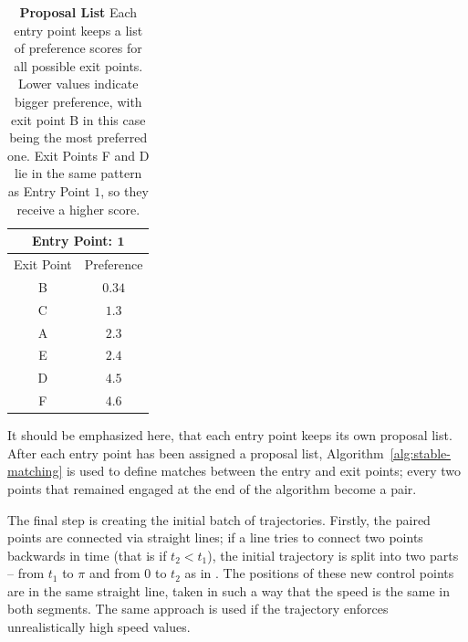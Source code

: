 \begin{table}[b]
	\centering
	\caption{
	\textbf{Proposal List} Each entry point keeps a list of preference scores for all possible exit points.
	Lower values indicate bigger preference, with exit point B in this case being the most preferred one.
	Exit Points F and D lie in the same pattern as Entry Point $1$, so they receive a higher score.
	}
	\begin{tabular}{|c|c|}
		\hline
		\multicolumn{2}{|c|}{\textbf{Entry Point: } $\mathbf{1}$}	\\
 		\hline
 		\hline
		Exit Point	&	Preference\\
		\hline
		\rowcolor[gray]{0.9}B	&	$\mathbf{0.34}$	\\
		C	&	$1.3$			\\
		A	&	$2.3$			\\
		E	&	$2.4$			\\
		D	&	$4.5$			\\
		F	&	$4.6$			\\
		\hline
		\end{tabular}
	\label{tab:proposal-list}
\end{table}

It should be emphasized here, that each entry point keeps its own proposal list.
After each entry point has been assigned a proposal list, Algorithm~\ref{alg:stable-matching} is used to define matches between the entry and exit points;
every two points that remained engaged at the end of the algorithm become a pair.

The final step is creating the initial batch of trajectories.
Firstly, the paired points are connected via straight lines;
if a line tries to connect two points backwards in time (that is if $t_2 < t_1$), the initial trajectory is split into two parts -- from $t_1$ to $\pi$ and from $0$ to $t_2$ as in \cite{Yersin:2009}.
The positions of these new control points are in the same straight line, taken in such a way that the speed is the same in both segments.
The same approach is used if the trajectory enforces unrealistically high speed values.


